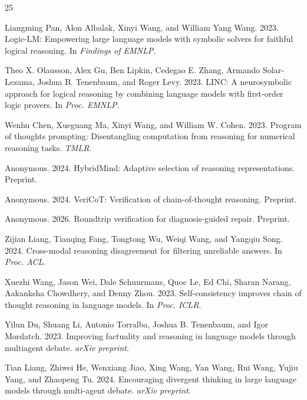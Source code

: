 \documentclass[11pt,a4paper]{article}
\begin{document}
\begin{thebibliography}{25}

Liangming Pan, Alon Albalak, Xinyi Wang, and William Yang Wang. 2023.
Logic-LM: Empowering large language models with symbolic solvers for faithful logical reasoning.
In \emph{Findings of EMNLP}.

Theo X. Olausson, Alex Gu, Ben Lipkin, Cedegao E. Zhang, Armando Solar-Lezama, Joshua B. Tenenbaum, and Roger Levy. 2023.
LINC: A neurosymbolic approach for logical reasoning by combining language models with first-order logic provers.
In \emph{Proc. EMNLP}.

Wenhu Chen, Xueguang Ma, Xinyi Wang, and William W. Cohen. 2023.
Program of thoughts prompting: Disentangling computation from reasoning for numerical reasoning tasks.
\emph{TMLR}.

Anonymous. 2024.
HybridMind: Adaptive selection of reasoning representations.
Preprint.

Anonymous. 2024.
VeriCoT: Verification of chain-of-thought reasoning.
Preprint.

Anonymous. 2026.
Roundtrip verification for diagnosis-guided repair.
Preprint.

Zijian Liang, Tianqing Fang, Tongtong Wu, Weiqi Wang, and Yangqiu Song. 2024.
Cross-modal reasoning disagreement for filtering unreliable answers.
In \emph{Proc. ACL}.

Xuezhi Wang, Jason Wei, Dale Schuurmans, Quoc Le, Ed Chi, Sharan Narang, Aakanksha Chowdhery, and Denny Zhou. 2023.
Self-consistency improves chain of thought reasoning in language models.
In \emph{Proc. ICLR}.

Yilun Du, Shuang Li, Antonio Torralba, Joshua B. Tenenbaum, and Igor Mordatch. 2023.
Improving factuality and reasoning in language models through multiagent debate.
\emph{arXiv preprint}.

Tian Liang, Zhiwei He, Wenxiang Jiao, Xing Wang, Yan Wang, Rui Wang, Yujiu Yang, and Zhaopeng Tu. 2024.
Encouraging divergent thinking in large language models through multi-agent debate.
\emph{arXiv preprint}.


\end{thebibliography}
\end{document}
